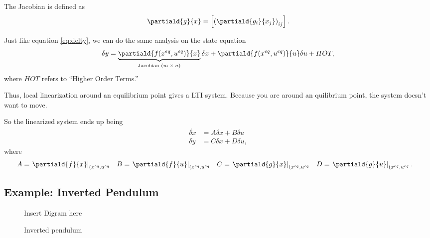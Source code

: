 \documentclass[10pt]{article}
\begin{document}
The Jacobian is defined as 
\begin{equation}
  \partiald{g}{x} = \left[ \left(\partiald{g_i}{x_j}\right)_{ij}\right].
\end{equation}

Just like equation \ref{eq:delty}, we can do the same analysis on the
state equation
\begin{equation}
\delta y =
\underbrace{\partiald{f(\meq{x},\meq{u})}{x}}_{\text{Jacobian $(m
    \times n)$}}\delta x +
\partiald{f(\meq{x},\meq{u})}{u}\delta u + HOT,
\end{equation}
where $HOT$ refers to ``Higher Order Terms.'' 

Thus, local linearization around an equilibrium point gives a LTI
system. Because you are around an quilibrium point, the system doesn't
want to move.

So the linearized system ends up being
\begin{equation}
  \begin{split}
    \dot{\delta x} &= A \delta x + B \delta u\\
    \delta y &= C\delta x + D \delta u,
  \end{split}
\end{equation}
where
\begin{align}
  A &= \left.\partiald{f}{x}\right|_{(\meq{x},\meq{u}} & 
  B &= \left.\partiald{f}{u}\right|_{(\meq{x},\meq{u}} & 
  C &= \left.\partiald{g}{x}\right|_{(\meq{x},\meq{u}} & 
  D &= \left.\partiald{g}{u}\right|_{(\meq{x},\meq{u}}.
\end{align}

\subsection{Example: Inverted Pendulum}

\begin{figure}
  \centering
  {\Large Insert Digram here}
  \caption{Inverted pendulum}
\end{figure}
\end{document}
